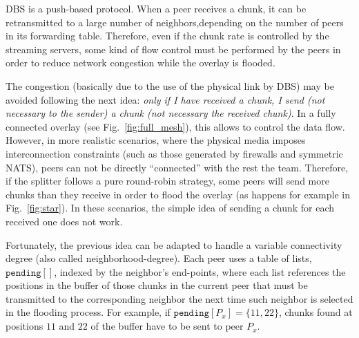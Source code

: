 

\label{sec:chunk_flooding}

\begin{comment}
\begin{figure*}
  \imgw{300}{graphics/peer_chunk_flooding.svg}
  \caption{Chunk flooding at peers.\label{fig:peer_chunk_flooding}}
\end{figure*}
\end{comment}

DBS is a push-based protocol. When a peer receives a chunk, it can be
retransmitted to a large number of neighbors,depending on the number
of peers in its forwarding table. Therefore, even if the chunk rate is
controlled by the streaming servers, some kind of flow control must be
performed by the peers in order to reduce network congestion while the
overlay is flooded.


The congestion (basically due to the use of the physical link by DBS)
may be avoided following the next idea: \textit{only if I have
  received a chunk, I send (not necessary to the sender) a chunk (not
  necessary the received chunk)}. In a fully connected overlay (see
Fig.~\ref{fig:full_mesh}), this allows to control the data
flow. However, in more realistic scenarios, where the physical media
imposes interconnection constraints (such as those generated by
firewalls and symmetric NATS), peers can not be directly ``connected''
with the rest the team. Therefore, if the splitter follows a pure
round-robin strategy, some peers will send more chunks than they
receive in order to flood the overlay (as happens for example in
Fig.~\ref{fig:star}). In these scenarios, the simple idea of sending a
chunk for each received one does not work.

Fortunately, the previous idea can be adapted to handle a variable
connectivity degree (also called \gls{neighborhood-degree}).  Each
peer uses a table of lists, $\mathtt{pending}[]$, indexed by the
neighbor's end-points, where each list references the positions in the
buffer of those chunks in the current peer that must be transmitted to
the corresponding neighbor the next time such neighbor is selected in
the flooding process. For example, if
$\mathtt{pending}[P_x]=\{11,22\}$, chunks found at positions $11$ and
$22$ of the buffer have to be sent to peer $P_x$.

